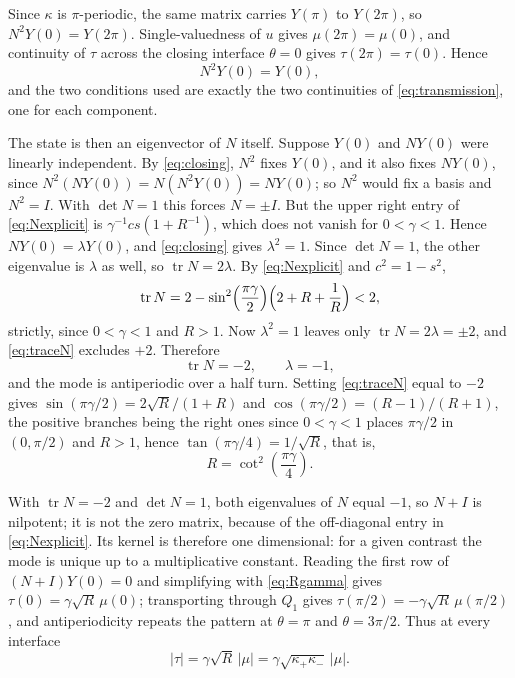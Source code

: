 \documentclass[10pt,pdftex]{amsart}%
\numberwithin{equation}{section}
\begin{document}
Since $\kappa$ is $\pi$-periodic, the same matrix carries $Y(\pi)$ to $Y(2\pi)$, so $N^2Y(0)=Y(2\pi)$.  Single-valuedness of $u$ gives $\mu(2\pi)=\mu(0)$, and continuity of $\tau$ across the closing interface $\theta=0$ gives $\tau(2\pi)=\tau(0)$.  Hence
\begin{equation}\label{eq:closing}
  N^2Y(0)=Y(0),
\end{equation}
and the two conditions used are exactly the two continuities of \eqref{eq:transmission}, one for each component.

The state is then an eigenvector of $N$ itself.  Suppose $Y(0)$ and $NY(0)$ were linearly independent.  By \eqref{eq:closing}, $N^2$ fixes $Y(0)$, and it also fixes $NY(0)$, since $N^2(NY(0))=N(N^2Y(0))=NY(0)$; so $N^2$ would fix a basis and $N^2=I$.  With $\det N=1$ this forces $N=\pm I$.  But the upper right entry of \eqref{eq:Nexplicit} is $\gamma^{-1}cs(1+R^{-1})$, which does not vanish for $0<\gamma<1$.  Hence $NY(0)=\lambda Y(0)$, and \eqref{eq:closing} gives $\lambda^2=1$.  Since $\det N=1$, the other eigenvalue is $\lambda$ as well, so $\operatorname{tr}N=2\lambda$.  By \eqref{eq:Nexplicit} and $c^2=1-s^2$,
\begin{equation}\label{eq:traceN}
  \operatorname{tr}N
  =2-\sin^2\Bigl(\frac{\pi\gamma}{2}\Bigr)\Bigl(2+R+\frac1R\Bigr)<2,
\end{equation}
strictly, since $0<\gamma<1$ and $R>1$.  Now $\lambda^2=1$ leaves only $\operatorname{tr}N=2\lambda=\pm2$, and \eqref{eq:traceN} excludes $+2$.  Therefore
\[
  \operatorname{tr}N=-2,\qquad \lambda=-1,
\]
and the mode is antiperiodic over a half turn.  Setting \eqref{eq:traceN} equal to $-2$ gives $\sin(\pi\gamma/2)=2\sqrt R/(1+R)$ and $\cos(\pi\gamma/2)=(R-1)/(R+1)$, the positive branches being the right ones since $0<\gamma<1$ places $\pi\gamma/2$ in $(0,\pi/2)$ and $R>1$, hence $\tan(\pi\gamma/4)=1/\sqrt R$, that is,
\begin{equation}\label{eq:Rgamma}
  R=\cot^2\left(\frac{\pi\gamma}{4}\right).
\end{equation}

With $\operatorname{tr}N=-2$ and $\det N=1$, both eigenvalues of $N$ equal $-1$, so $N+I$ is nilpotent; it is not the zero matrix, because of the off-diagonal entry in \eqref{eq:Nexplicit}.  Its kernel is therefore one dimensional: for a given contrast the mode is unique up to a multiplicative constant.  Reading the first row of $(N+I)Y(0)=0$ and simplifying with \eqref{eq:Rgamma} gives $\tau(0)=\gamma\sqrt R\,\mu(0)$; transporting through $Q_1$ gives $\tau(\pi/2)=-\gamma\sqrt R\,\mu(\pi/2)$, and antiperiodicity repeats the pattern at $\theta=\pi$ and $\theta=3\pi/2$.  Thus at every interface
\begin{equation}\label{eq:interface-eigenvector}
  |\tau|=\gamma\sqrt R\,|\mu|=\gamma\sqrt{\kappa_+\kappa_-}\,|\mu| .
\end{equation}
\end{document}
